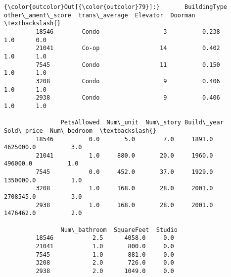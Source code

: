 \documentclass[11pt]{article}
\begin{document}
\begin{Verbatim}[commandchars=\\\{\}]
{\color{outcolor}Out[{\color{outcolor}79}]:}       BuildingType  other\_ament\_score  trans\_average  Elevator  Doorman  \textbackslash{}
         18546        Condo                  3          0.238       1.0      0.0   
         21041        Co-op                 14          0.402       1.0      1.0   
         7545         Condo                 11          0.150       1.0      1.0   
         3208         Condo                  9          0.406       1.0      1.0   
         2938         Condo                  9          0.406       1.0      1.0   
         
                PetsAllowed  Num\_unit  Num\_story Build\_year  Sold\_price  Num\_bedroom  \textbackslash{}
         18546          0.0       5.0        7.0     1891.0   4625000.0          3.0   
         21041          1.0     880.0       20.0     1960.0    496000.0          1.0   
         7545           0.0     452.0       37.0     1929.0   1350000.0          1.0   
         3208           1.0     168.0       28.0     2001.0   2708545.0          3.0   
         2938           1.0     168.0       28.0     2001.0   1476462.0          2.0   
         
                Num\_bathroom  SquareFeet  Studio  
         18546           2.5      4058.0     0.0  
         21041           1.0       800.0     0.0  
         7545            1.0       881.0     0.0  
         3208            2.0       726.0     0.0  
         2938            2.0      1049.0     0.0  
\end{Verbatim}
            
\end{document}
